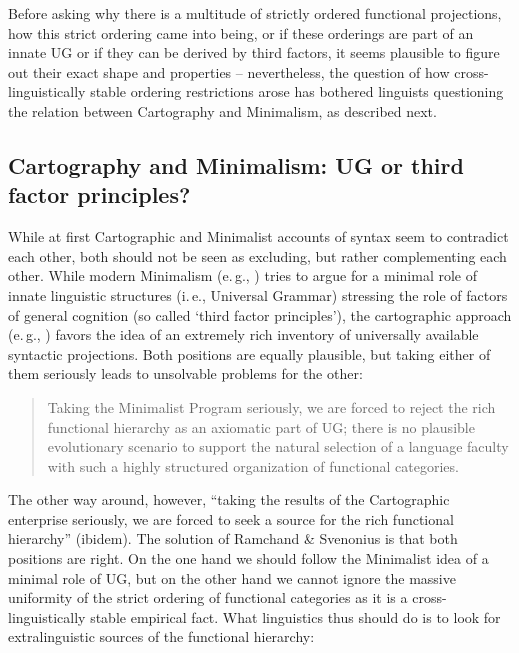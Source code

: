 \noindent Before asking why there is a multitude of strictly ordered functional projections, how this strict ordering came into being, or if these orderings are part of an innate UG or if they can be derived by third factors, it seems plausible to figure out their exact shape and properties -- nevertheless, the question of how cross-linguistically stable ordering restrictions arose has bothered linguists questioning the relation between Cartography and Minimalism, as described next.

\subsection{Cartography and Minimalism: UG or third factor principles?}
\noindent While at first Cartographic and Minimalist accounts of syntax seem to contradict each other, both should not be seen as excluding, but rather complementing each other. While modern Minimalism (e.\,g., \citealt{chomsky2005three}) tries to argue for a minimal role of innate linguistic structures (i.\,e., Universal Grammar) stressing the role of factors of general cognition (so called `third factor principles'), the cartographic approach (e.\,g., \citealt{cinque1999adverbs}) favors the idea of an extremely rich inventory of universally available syntactic projections. Both positions are equally plausible, but taking either of them seriously leads to unsolvable problems for the other:

\begin{quote}
Taking the Minimalist Program seriously, we are forced to reject the rich functional hierarchy as an axiomatic part of UG; there is no plausible evolutionary scenario to support the natural selection of a language faculty with such a highly structured organization of functional categories. \citep[172]{ramchand2014deriving}
\end{quote}

\noindent The other way around, however, ``taking the results of the Cartographic enterprise seriously, we are forced to seek a source for the rich functional hierarchy'' (ibidem). The solution of Ramchand \& Svenonius is that both positions are right. On the one hand we should follow the Minimalist idea of a minimal role of UG, but on the other hand we cannot ignore the massive uniformity of the strict ordering of functional categories as it is a cross-linguistically stable empirical fact. What linguistics thus should do is to look for extralinguistic sources of the functional hierarchy:

